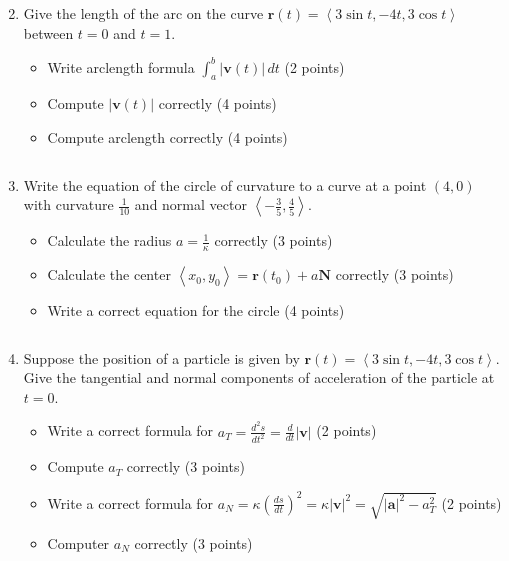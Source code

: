 \documentclass[12pt]{article}
\newcommand{\up}{$~$\vspace*{-0.7in}}
\newcommand{\liner}{\noindent\underline{\hspace*{7in}}}
\newcommand{\ds}{\displaystyle}
\renewcommand{\vec}{\mathbf}
\newcommand{\<}{\left<}
\renewcommand{\>}{\right>}
\newcommand{\dvar}{\,d}
\begin{document}
\begin{enumerate}
\vspace*{6.5in}

\liner

\newpage\up


\item Give the length of the arc on the curve $\vec{r}(t) = \left< 3\sin t, -4t, 3\cos t \right>$ between $t=0$ and $t=1$.

  \begin{itemize}
    \item Write arclength formula $\ds \int_a^b |\vec{v}(t)| \dvar{t}$ (2 points)
    \item Compute $|\vec{v}(t)|$ correctly (4 points)
    \item Compute arclength correctly (4 points)
  \end{itemize}

\vspace*{8in}

\liner
\newpage\up


\item Write the equation of the circle of curvature to a curve at a point $(4,0)$ with curvature $\frac{1}{10}$ and normal vector $\left<-\frac{3}{5},\frac{4}{5}\right>$.

  \begin{itemize}
    \item Calculate the radius $a = \frac{1}{\kappa}$ correctly (3 points)
    \item Calculate the center $\<x_0,y_0\> = \vec{r}(t_0) + a\vec{N}$ correctly (3 points)
    \item Write a correct equation for the circle (4 points)
  \end{itemize}

\vspace*{7.5in}

\liner
\newpage\up

\item Suppose the position of a particle is given by $\vec{r}(t) = \left< 3\sin t, -4t, 3\cos t \right>$. Give the tangential and normal components of acceleration of the particle at $t=0$.

  \begin{itemize}
    \item Write a correct formula for $a_T = \frac{d^2s}{dt^2} = \frac{d}{dt}|\vec{v}|$ (2 points)
    \item Compute $a_T$ correctly (3 points)
    \item Write a correct formula for $a_N = \kappa\left(\frac{ds}{dt}\right)^2 = \kappa|\vec{v}|^2 = \sqrt{|\vec{a}|^2 - a_T^2}$ (2 points)
    \item Computer $a_N$ correctly (3 points)
  \end{itemize}


\end{enumerate}
\end{document}
